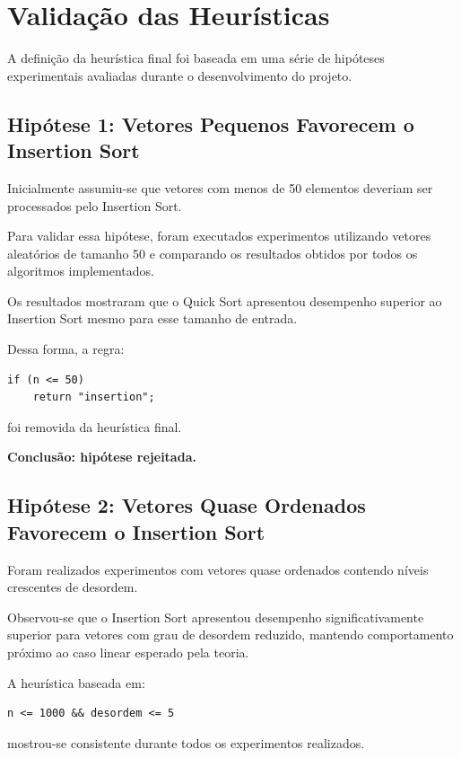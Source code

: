 \documentclass{article}
\begin{document}
\section{Validação das Heurísticas}

A definição da heurística final foi baseada em uma série de hipóteses experimentais avaliadas durante o desenvolvimento do projeto.

\subsection{Hipótese 1: Vetores Pequenos Favorecem o Insertion Sort}

Inicialmente assumiu-se que vetores com menos de 50 elementos deveriam ser processados pelo Insertion Sort.

Para validar essa hipótese, foram executados experimentos utilizando vetores aleatórios de tamanho 50 e comparando os resultados obtidos por todos os algoritmos implementados.

Os resultados mostraram que o Quick Sort apresentou desempenho superior ao Insertion Sort mesmo para esse tamanho de entrada.

Dessa forma, a regra:

\begin{verbatim}
if (n <= 50)
    return "insertion";
\end{verbatim}

foi removida da heurística final.

\textbf{Conclusão: hipótese rejeitada.}

\subsection{Hipótese 2: Vetores Quase Ordenados Favorecem o Insertion Sort}

Foram realizados experimentos com vetores quase ordenados contendo níveis crescentes de desordem.

Observou-se que o Insertion Sort apresentou desempenho significativamente superior para vetores com grau de desordem reduzido, mantendo comportamento próximo ao caso linear esperado pela teoria.

A heurística baseada em:

\begin{verbatim}
n <= 1000 && desordem <= 5
\end{verbatim}

mostrou-se consistente durante todos os experimentos realizados.
\end{document}
